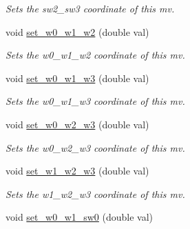 \begin{DoxyCompactItemize}
\begin{DoxyCompactList}\small\item\em Sets the sw2\-\_\-sw3 coordinate of this mv. \end{DoxyCompactList}\item 
\hypertarget{classe3ga_1_1mv_aa0360ca2d6077b9f7e499b0e37d12be3}{void \hyperlink{classe3ga_1_1mv_aa0360ca2d6077b9f7e499b0e37d12be3}{set\-\_\-w0\-\_\-w1\-\_\-w2} (double val)}\label{classe3ga_1_1mv_aa0360ca2d6077b9f7e499b0e37d12be3}

\begin{DoxyCompactList}\small\item\em Sets the w0\-\_\-w1\-\_\-w2 coordinate of this mv. \end{DoxyCompactList}\item 
\hypertarget{classe3ga_1_1mv_a1afb2638642913cd4b93b4575f9db094}{void \hyperlink{classe3ga_1_1mv_a1afb2638642913cd4b93b4575f9db094}{set\-\_\-w0\-\_\-w1\-\_\-w3} (double val)}\label{classe3ga_1_1mv_a1afb2638642913cd4b93b4575f9db094}

\begin{DoxyCompactList}\small\item\em Sets the w0\-\_\-w1\-\_\-w3 coordinate of this mv. \end{DoxyCompactList}\item 
\hypertarget{classe3ga_1_1mv_a661c24187f95ac7df89adf9703bf2638}{void \hyperlink{classe3ga_1_1mv_a661c24187f95ac7df89adf9703bf2638}{set\-\_\-w0\-\_\-w2\-\_\-w3} (double val)}\label{classe3ga_1_1mv_a661c24187f95ac7df89adf9703bf2638}

\begin{DoxyCompactList}\small\item\em Sets the w0\-\_\-w2\-\_\-w3 coordinate of this mv. \end{DoxyCompactList}\item 
\hypertarget{classe3ga_1_1mv_af58ad518327ab8ff6c6e276c256702b8}{void \hyperlink{classe3ga_1_1mv_af58ad518327ab8ff6c6e276c256702b8}{set\-\_\-w1\-\_\-w2\-\_\-w3} (double val)}\label{classe3ga_1_1mv_af58ad518327ab8ff6c6e276c256702b8}

\begin{DoxyCompactList}\small\item\em Sets the w1\-\_\-w2\-\_\-w3 coordinate of this mv. \end{DoxyCompactList}\item 
\hypertarget{classe3ga_1_1mv_a433773a7e930d23591a5ef037964b7df}{void \hyperlink{classe3ga_1_1mv_a433773a7e930d23591a5ef037964b7df}{set\-\_\-w0\-\_\-w1\-\_\-sw0} (double val)}\label{classe3ga_1_1mv_a433773a7e930d23591a5ef037964b7df}


\end{DoxyCompactItemize}
